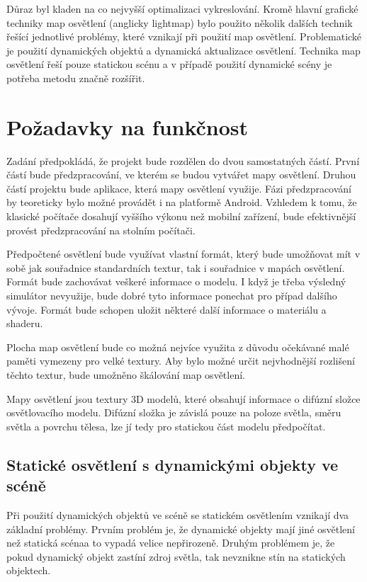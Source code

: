 \documentclass[11pt,twoside,a4paper]{book}
\begin{document}
Důraz byl kladen na co nejvyšší optimalizaci vykreslování. Kromě hlavní grafické techniky map osvětlení (anglicky lightmap) bylo použito několik dalších technik řešící jednotlivé problémy, které vznikají při použití map osvětlení. Problematické je použití dynamických objektů a dynamická aktualizace osvětlení. Technika map osvětlení řeší pouze statickou scénu a v případě použití dynamické scény je potřeba metodu značně rozšířit.

\section{Požadavky na funkčnost}
Zadání předpokládá, že projekt bude rozdělen do dvou samostatných částí. První částí bude předzpracování, ve kterém se budou vytvářet mapy osvětlení. Druhou částí projektu bude aplikace, která mapy osvětlení využije. Fázi předzpracování by teoreticky bylo možné provádět i na platformě Android. Vzhledem k tomu, že klasické počítače dosahují vyššího výkonu než mobilní zařízení, bude efektivnější provést předzpracování na stolním počítači.

Předpočtené osvětlení bude využívat vlastní formát, který bude umožňovat mít v sobě jak souřadnice standardních textur, tak i souřadnice v mapách osvětlení. Formát bude zachovávat veškeré informace o modelu. I když je třeba výsledný simulátor nevyužije, bude dobré tyto informace ponechat pro případ dalšího vývoje. Formát bude schopen uložit některé další informace o materiálu a shaderu.

Plocha map osvětlení bude co možná nejvíce využita z důvodu očekávané malé paměti vymezeny pro velké textury. Aby bylo možné určit nejvhodnější rozlišení těchto textur, bude umožněno škálování map osvětlení.

Mapy osvětlení jsou textury 3D modelů, které obsahují informace o difúzní složce osvětlovacího modelu. Difúzní složka je závislá pouze na poloze světla, směru světla a povrchu tělesa, lze jí tedy pro statickou část modelu předpočítat.

\subsection{Statické osvětlení s dynamickými objekty ve scéně}
Při použití dynamických objektů ve scéně se statickém osvětlením vznikají dva základní problémy. Prvním problém je, že dynamické objekty mají jiné osvětlení než statická scéna\linebreak a to vypadá velice nepřirozeně. Druhým problémem je, že pokud dynamický objekt zastíní zdroj světla, tak nevznikne stín na statických objektech.
\end{document}
